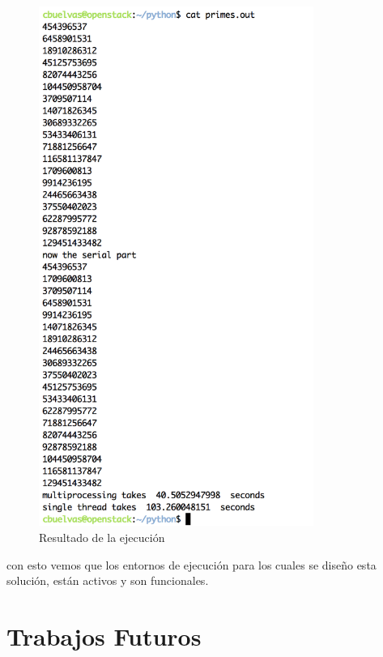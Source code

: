  \begin{figure}[h]
\centering
\includegraphics[width=0.8\textwidth]{images/clusterout.png}
\decoRule
\caption{Resultado de la ejecución}
\label{fig:python out}
\end{figure}
\FloatBarrier

con esto vemos que los entornos de ejecución para los cuales se diseño esta solución, están activos y son funcionales.

\section{Trabajos Futuros}

